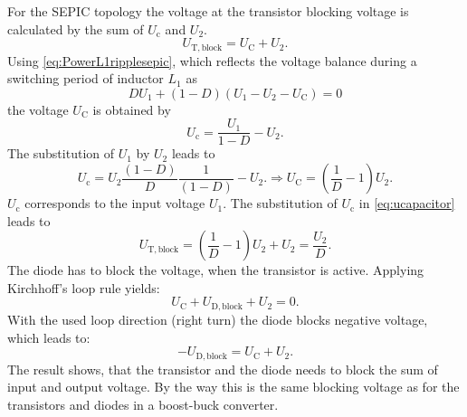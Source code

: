 \begin{solutionblock}
    For the SEPIC topology the voltage at the transistor blocking voltage is calculated by the sum of 
    $U_\mathrm{c}$ and $U_\mathrm{2}$.
    \begin{equation}
        U_\mathrm{T,block}=U_\mathrm{C}+U_\mathrm{2}.
    \end{equation}
    Using \eqref{eq:PowerL1ripplesepic}, which reflects the voltage balance during a switching period 
    of inductor $L_1$ as
    \begin{equation}
        DU_\mathrm{1}+\left(1-D\right)\left(U_\mathrm{1}-U_\mathrm{2}-U_\mathrm{C}\right)=0
    \end{equation}
    the voltage $U_\mathrm{C}$ is obtained by
    \begin{equation}
        U_\mathrm{c}=\frac{U_\mathrm{1}}{1-D}-U_\mathrm{2}.
    \end{equation}
    The substitution of $U_\mathrm{1}$ by $U_\mathrm{2}$ leads to
    \begin{equation}
        U_\mathrm{c}=U_\mathrm{2}\frac{\left(1-D\right)}{D}\frac{1}{\left(1-D\right)}-U_\mathrm{2}.
        \Rightarrow U_\mathrm{C}=\left( \frac{1}{D}-1\right) U_\mathrm{2}.
        \label{eq:ucapacitor}        
    \end{equation}
    $U_\mathrm{c}$ corresponds to the input voltage $U_\mathrm{1}$. The substitution of $U_\mathrm{c}$ in \eqref{eq:ucapacitor} leads to 
    \begin{equation}
        U_\mathrm{T,block}=\left( \frac{1}{D}-1\right) U_\mathrm{2}+U_\mathrm{2}=\frac{U_\mathrm{2}}{D}.
    \end{equation}
    The diode has to block the voltage, when the transistor is active. Applying Kirchhoff's loop rule yields:
    \begin{equation}
        U_\mathrm{C}+U_\mathrm{D,block}+U_\mathrm{2}=0.
    \end{equation}
    With the used loop direction (right turn) the diode blocks negative voltage, which leads to:
    \begin{equation}
        -U_\mathrm{D,block}=U_\mathrm{C}+U_\mathrm{2}.
    \end{equation}
    The result shows, that the transistor and the diode needs to block the sum of input and output voltage. 
    By the way this is the same blocking voltage as for the transistors and diodes in a boost-buck converter.
\end{solutionblock}

